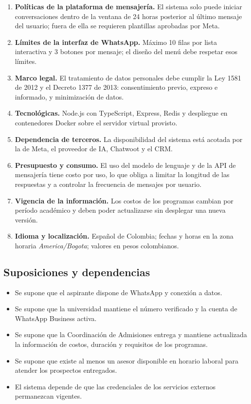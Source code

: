 \documentclass[12pt,a4paper]{report}
\begin{document}
\begin{enumerate}[label=\textbf{R-\arabic*.}, leftmargin=1.5cm, itemsep=3pt]
    \item \textbf{Políticas de la plataforma de mensajería.} El sistema solo puede iniciar
    conversaciones dentro de la ventana de 24 horas posterior al último mensaje del usuario; fuera de
    ella se requieren plantillas aprobadas por Meta.
    \item \textbf{Límites de la interfaz de WhatsApp.} Máximo 10 filas por lista interactiva y 3
    botones por mensaje; el diseño del menú debe respetar esos límites.
    \item \textbf{Marco legal.} El tratamiento de datos personales debe cumplir la Ley 1581 de 2012
    y el Decreto 1377 de 2013: consentimiento previo, expreso e informado, y minimización de datos.
    \item \textbf{Tecnológicas.} Node.js con TypeScript, Express, Redis y despliegue en contenedores
    Docker sobre el servidor virtual provisto.
    \item \textbf{Dependencia de terceros.} La disponibilidad del sistema está acotada por la de
    Meta, el proveedor de IA, Chatwoot y el CRM.
    \item \textbf{Presupuesto y consumo.} El uso del modelo de lenguaje y de la API de mensajería
    tiene costo por uso, lo que obliga a limitar la longitud de las respuestas y a controlar la
    frecuencia de mensajes por usuario.
    \item \textbf{Vigencia de la información.} Los costos de los programas cambian por período
    académico y deben poder actualizarse sin desplegar una nueva versión.
    \item \textbf{Idioma y localización.} Español de Colombia; fechas y horas en la zona horaria
    \textit{America/Bogota}; valores en pesos colombianos.
\end{enumerate}

\subsection{Suposiciones y dependencias}

\begin{itemize}[itemsep=2pt]
    \item Se supone que el aspirante dispone de WhatsApp y conexión a datos.
    \item Se supone que la universidad mantiene el número verificado y la cuenta de WhatsApp
    Business activa.
    \item Se supone que la Coordinación de Admisiones entrega y mantiene actualizada la información
    de costos, duración y requisitos de los programas.
    \item Se supone que existe al menos un asesor disponible en horario laboral para atender los
    prospectos entregados.
    \item El sistema depende de que las credenciales de los servicios externos permanezcan vigentes.
\end{itemize}
\end{document}
